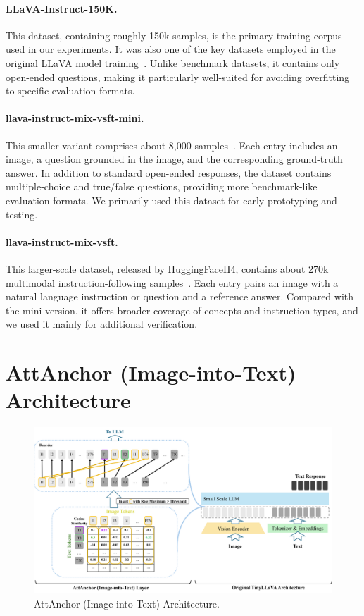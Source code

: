 \documentclass[11pt]{article}
\begin{document}
\paragraph{LLaVA-Instruct-150K.} 
This dataset, containing roughly 150k samples, is the primary training corpus used in our experiments. It was also one of the key datasets employed in the original LLaVA model training~\citep{liu2023llava}. Unlike benchmark datasets, it contains only open-ended questions, making it particularly well-suited for avoiding overfitting to specific evaluation formats. 

\paragraph{llava-instruct-mix-vsft-mini.} 
This smaller variant comprises about 8{,}000 samples~\citep{unsloth_llava_instruct_mix_vsft_mini}. Each entry includes an image, a question grounded in the image, and the corresponding ground-truth answer. In addition to standard open-ended responses, the dataset contains multiple-choice and true/false questions, providing more benchmark-like evaluation formats. We primarily used this dataset for early prototyping and testing.  

\paragraph{llava-instruct-mix-vsft.} 
This larger-scale dataset, released by HuggingFaceH4, contains about 270k multimodal instruction-following samples~\citep{huggingfaceh4_llava_instruct_mix_vsft}. Each entry pairs an image with a natural language instruction or question and a reference answer. Compared with the mini version, it offers broader coverage of concepts and instruction types, and we used it mainly for additional verification.



\section{AttAnchor (Image-into-Text) Architecture}
\label{app:image_into_text_arch}

\begin{figure}[H]
    \centering    \includegraphics[width=1.0\linewidth]{Attanchor_I2T_arch.png}
    \caption{AttAnchor (Image-into-Text) Architecture.}
    \label{fig:coser}
\end{figure}
\end{document}
